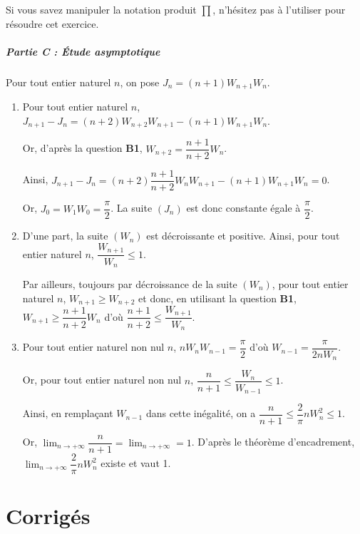 \documentclass[11pt,fleqn, openany]{book} %
\begin{document}
\begin{solution}
\begin{enumerate}
Si vous savez manipuler la notation produit $\prod$, n'hésitez pas à l'utiliser pour résoudre cet exercice.

\end{enumerate}

\paragraph{Partie C : Étude asymptotique}

Pour tout entier naturel $n$, on pose $J_n=(n+1)W_{n+1}W_n$.
\begin{enumerate}
\item Pour tout entier naturel $n$, $J_{n+1}-J_n = (n+2)W_{n+2}W_{n+1}-(n+1)W_{n+1}W_n$. 

Or, d'après la question \textbf{B1}, $W_{n+2}=\dfrac{n+1}{n+2}W_n$. 

Ainsi, $J_{n+1}-J_n = (n+2)\dfrac{n+1}{n+2}W_nW_{n+1}-(n+1)W_{n+1}W_n=0$.

Or, $J_0=W_1W_0=\dfrac{\pi}{2}$. La suite $(J_n)$ est donc constante égale à $\dfrac{\pi}{2}$.

\item D'une part, la suite $(W_n)$ est décroissante et positive. Ainsi, pour tout entier naturel $n$, $\dfrac{W_{n+1}}{W_n} \leqslant 1$. 

Par ailleurs, toujours par décroissance de la suite $(W_n)$, pour tout entier naturel $n$, $W_{n+1} \geqslant W_{n+2}$ et donc, en utilisant la question \textbf{B1},  $W_{n+1} \geqslant \dfrac{n+1}{n+2}W_n$ d'où $\dfrac{n+1}{n+2} \leqslant \dfrac{W_{n+1}}{W_n}$.

\item Pour tout entier naturel non nul $n$, $nW_nW_{n-1}=\dfrac{\pi}{2}$ d'où $W_{n-1}=\dfrac{\pi}{2nW_n}$. 

Or, pour tout entier naturel non nul $n$, $\dfrac{n}{n+1} \leqslant \dfrac{W_n}{W_{n-1}} \leqslant 1$.

 Ainsi, en remplaçant $W_{n-1}$ dans cette inégalité, on a $\dfrac{n}{n+1} \leqslant   \dfrac{2}{\pi}n W_n^2 \leqslant 1$.

Or, $\displaystyle\lim_{n\to+\infty}\dfrac{n}{n+1}=\displaystyle\lim_{n\to+\infty}=1$. D'après le théorème d'encadrement, $\displaystyle\lim_{n \to + \infty} \dfrac{2}{\pi}n W_n^2$ existe et vaut 1.
\end{enumerate}
\end{solution}




\chapter{Corrigés}


\printsolutions[headings={false} ]
\end{document}
